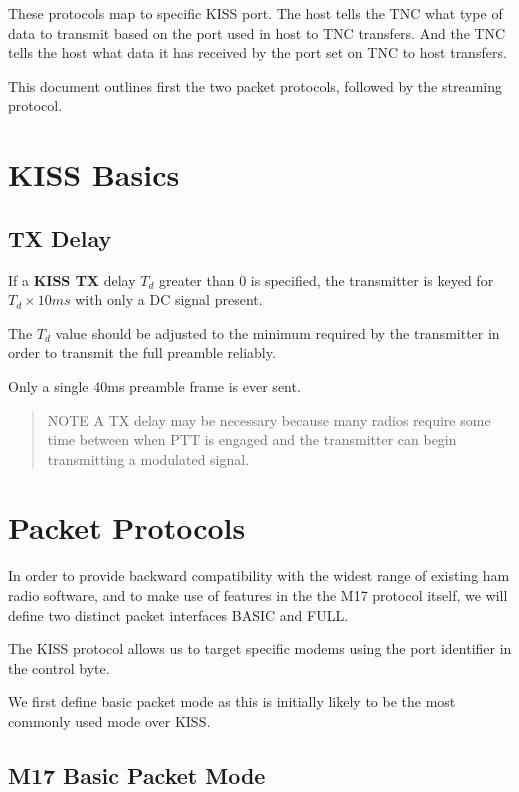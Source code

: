 \documentclass[a4paper,11pt]{book}
\begin{document}
These protocols map to specific KISS port. The host tells the TNC what type of data to transmit based on the port used in host to TNC transfers. And the TNC tells the host what data it has received by the port set on TNC to host transfers.

This document outlines first the two packet protocols, followed by the streaming protocol.

\section{KISS Basics}

\subsection{TX Delay}

If a \textbf{KISS TX} delay $T_d$ greater than 0 is specified, the transmitter is keyed for $T_d \times 10ms$ with only a DC signal present.

The $T_d$ value should be adjusted to the minimum required by the
transmitter in order to transmit the full preamble reliably.

Only a single 40ms preamble frame is ever sent.

\begin{quote}
	NOTE A TX delay may be necessary because many radios require some 	time between when PTT is engaged and the transmitter can begin 	transmitting a modulated signal.
\end{quote}

\section{Packet Protocols}

In order to provide backward compatibility with the widest range of existing ham radio software, and to make use of features in the the M17 protocol itself, we will define two distinct packet interfaces BASIC and FULL.

The KISS protocol allows us to target specific modems using the port identifier in the control byte.

We first define basic packet mode as this is initially likely to be the most commonly used mode over KISS.

\subsection{M17 Basic Packet Mode}
\end{document}
